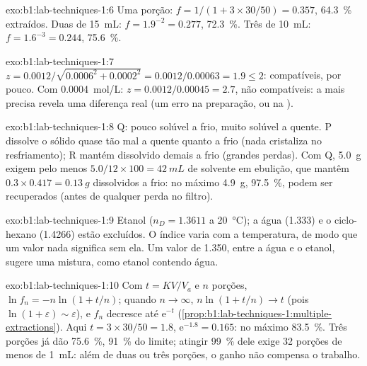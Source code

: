 \begin{solution}{exo:b1:lab-techniques-1:6}
Uma porção: $f = 1/(1 + 3 \times 30/50) = 0.357$, \qty{64.3}{\percent}
extraídos. Duas de \qty{15}{mL}: $f = 1.9^{-2} = 0.277$,
\qty{72.3}{\percent}. Três de \qty{10}{mL}: $f = 1.6^{-3} = 0.244$,
\qty{75.6}{\percent}.
\end{solution}

\begin{solution}{exo:b1:lab-techniques-1:7}
$z = 0.0012/\sqrt{0.0006^2 + 0.0002^2} = 0.0012/0.00063 = 1.9 \le 2$:
compatíveis, por pouco. Com \qty{0.0004}{mol/L}: $z = 0.0012/0.00045 = 2.7$,
não compatíveis: a  mais precisa revela uma diferença real (um
erro na preparação, ou na ).
\end{solution}

\begin{solution}{exo:b1:lab-techniques-1:8}
Q: pouco solúvel a frio, muito solúvel a quente. P dissolve o sólido
quase tão mal a quente quanto a frio (nada cristaliza no resfriamento); R
mantém dissolvido demais a frio (grandes perdas). Com Q, \qty{5.0}{g}
exigem pelo menos $5.0/12 \times 100 = \qty{42}{mL}$ de solvente em
ebulição, que mantêm $0.3 \times 0.417 = \qty{0.13}{g}$ dissolvidos a
frio: no máximo \qty{4.9}{g}, \qty{97.5}{\percent}, podem ser recuperados
(antes de qualquer perda no filtro).
\end{solution}

\begin{solution}{exo:b1:lab-techniques-1:9}
Etanol ($n_D = 1.3611$ a \qty{20}{\celsius}); a água (1.333) e o
ciclo-hexano (1.4266) estão excluídos. O índice varia com a temperatura,
de modo que um valor nada significa sem ela. Um valor de 1.350, entre a
água e o etanol, sugere uma mistura, como etanol contendo água.
\end{solution}

\begin{solution}{exo:b1:lab-techniques-1:10}
Com $t = KV/V_a$ e $n$ porções, $\ln f_n = -n\ln(1 + t/n)$; quando
$n \to \infty$, $n \ln(1 + t/n) \to t$ (pois $\ln(1 + \varepsilon) \sim
\varepsilon$), e $f_n$ decresce até $\mathrm{e}^{-t}$ (\cref{prop:b1:lab-techniques-1:multiple-extractions}).
Aqui $t = 3 \times 30/50 = 1.8$, $\mathrm{e}^{-1.8} = 0.165$: no máximo
\qty{83.5}{\percent}. Três porções já dão \qty{75.6}{\percent},
\qty{91}{\percent} do limite; atingir \qty{99}{\percent} dele exige 32
porções de menos de \qty{1}{mL}: além de duas ou três porções, o ganho
não compensa o trabalho.
\end{solution}

